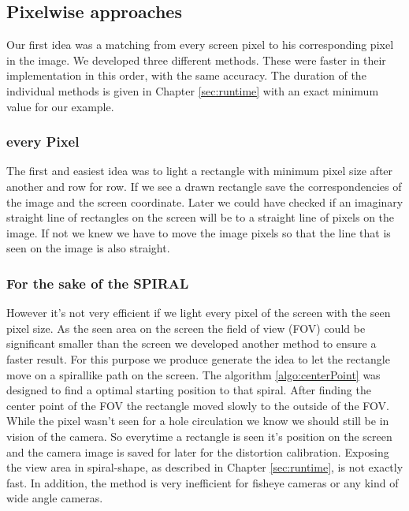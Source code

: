 \documentclass[journal,final,a4paper,twoside]{PS}
\begin{document}
\subsection{Pixelwise approaches}
Our first idea was a matching from every screen pixel to his corresponding pixel in the image. We developed three different methods. These were faster in their implementation in this order, with the same accuracy. The duration of the individual methods is given in Chapter \ref{sec:runtime} with an exact minimum value for our example.
\subsubsection{every Pixel}
The first and easiest idea was to light a rectangle with minimum pixel size after another and row for row. If we see a drawn rectangle save the correspondencies of the image and the screen coordinate. Later we could have checked if an imaginary straight line of rectangles on the screen will be to a straight line of pixels on the image. If not we knew we have to move the image pixels so that the line that is seen on the image is also straight.
\subsubsection{For the sake of the \textbf{SPIRAL}}
However it's not very efficient if we light every pixel of the screen with the seen pixel size. As the seen area on the screen the field of view (FOV) could be significant smaller than the screen we developed another method to ensure a faster result. For this purpose we produce generate the idea to let the rectangle move on a spirallike path on the screen. The algorithm \ref{algo:centerPoint} was designed to find a optimal starting position to that spiral. After finding the center point of the FOV the rectangle moved slowly to the outside of the FOV. While the pixel wasn't seen for a hole circulation we know we should still be in vision of the camera. So everytime a rectangle is seen it's position on the screen and the camera image is saved for later for the distortion calibration. Exposing the view area in spiral-shape, as described in Chapter \ref{sec:runtime}, is not exactly fast. In addition, the method is very inefficient for fisheye cameras or any kind of wide angle cameras. 

\end{document}
